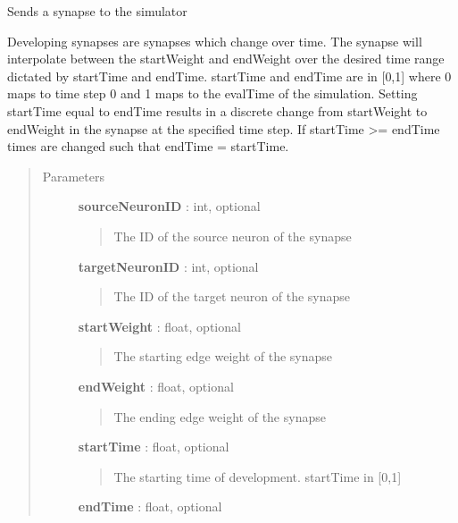 \documentclass[letterpaper,10pt,english]{sphinxmanual}
\begin{document}
\begin{fulllineitems}

\begin{fulllineitems}
\label{code:pyrosim.PYROSIM.Send_Developing_Synapse}
Sends a synapse to the simulator

Developing synapses are synapses which change over time. 
The synapse will interpolate between the startWeight and endWeight
over the desired time range dictated by startTime and endTime.
startTime and endTime are in {[}0,1{]} where 0 maps to time step 0
and 1 maps to the evalTime of the simulation. Setting startTime
equal to endTime results in a discrete change from startWeight
to endWeight in the synapse at the specified time step. If
startTime \textgreater{}= endTime times are changed such that
endTime = startTime.
\begin{quote}\begin{description}
\item[{Parameters}] \leavevmode
\textbf{sourceNeuronID} : int, optional
\begin{quote}

The ID of the source neuron of the synapse
\end{quote}

\textbf{targetNeuronID} : int, optional
\begin{quote}

The ID of the target neuron of the synapse
\end{quote}

\textbf{startWeight} : float, optional
\begin{quote}

The starting edge weight of the synapse
\end{quote}

\textbf{endWeight} : float, optional
\begin{quote}

The ending edge weight of the synapse
\end{quote}

\textbf{startTime} : float, optional
\begin{quote}

The starting time of development. startTime in {[}0,1{]}
\end{quote}

\textbf{endTime} : float, optional
\begin{quote}


\end{quote}
\end{description}
\end{quote}
\end{fulllineitems}
\end{fulllineitems}
\end{document}
